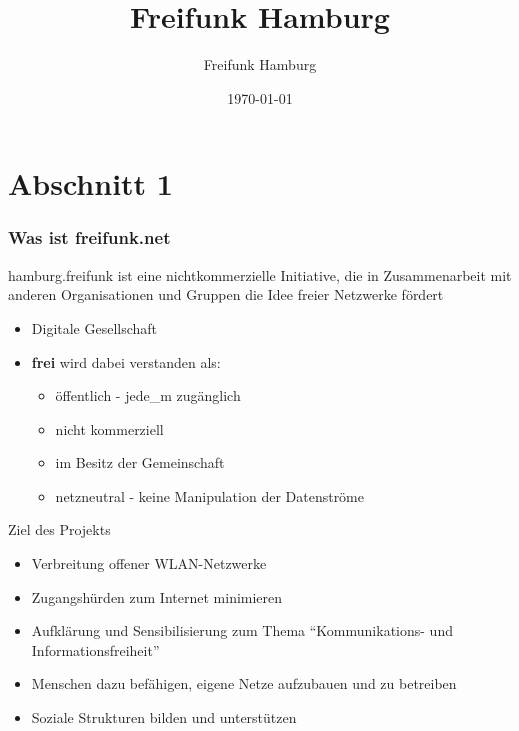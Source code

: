 \documentclass[aspectratio=43]{beamer}
\title{Freifunk Hamburg}
\author{Freifunk Hamburg}
\date{\today}
\begin{document}
\maketitle
\frame{\tableofcontents[currentsection]}

\section{Abschnitt 1}
\begin{frame} %
  \frametitle{Was ist freifunk.net} %
  hamburg.freifunk ist eine nichtkommerzielle Initiative, die in Zusammenarbeit mit anderen Organisationen und Gruppen die Idee freier Netzwerke fördert
  \begin{itemize}
	\item Digitale Gesellschaft	
  \end{itemize}
\end{frame}

\begin{frame}
\begin{itemize}
	\item \textbf{frei} wird dabei verstanden als:
	\begin{itemize}
		\item öffentlich - jede\_m zugänglich
		\item nicht kommerziell
		\item im Besitz der Gemeinschaft
		\item netzneutral - keine Manipulation der Datenströme
	\end{itemize}
  \end{itemize}
\end{frame}

\begin{frame}{Ziel des Projekts}
	\begin{itemize}
		\item Verbreitung offener WLAN-Netzwerke
		\item Zugangshürden zum Internet minimieren
		\item Aufklärung und Sensibilisierung zum Thema ``Kommunikations- und Informationsfreiheit''
		\item Menschen dazu befähigen, eigene Netze aufzubauen und zu betreiben
		\item Soziale Strukturen bilden und unterstützen %
	\end{itemize}
\end{frame}
\end{document}

